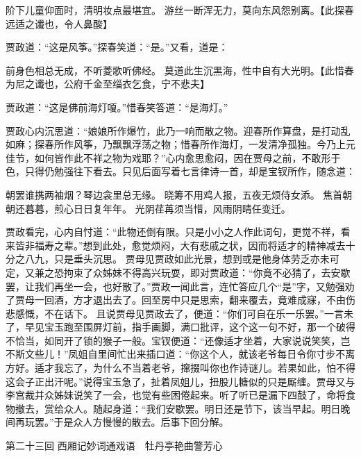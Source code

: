 \documentclass[12pt,oneside]{book}
\begin{document}
阶下儿童仰面时，清明妆点最堪宜。
游丝一断浑无力，莫向东风怨别离。【此探春远适之谶也，令人鼻酸】

贾政道：“这是风筝。”探春笑道：“是。”又看，道是：

前身色相总无成，不听菱歌听佛经。
莫道此生沉黑海，性中自有大光明。【此惜春为尼之谶也，公府千金至缁衣乞食，宁不悲夫】

贾政道：“这是佛前海灯嗄。”惜春笑答道：“是海灯。”

贾政心内沉思道：“娘娘所作爆竹，此乃一响而散之物。迎春所作算盘，是打动乱如麻；探春所作风筝，乃飘飘浮荡之物；惜春所作海灯，一发清净孤独。今乃上元佳节，如何皆作此不祥之物为戏耶？”心内愈思愈闷，因在贾母之前，不敢形于色，只得仍勉强往下看去。只见后面写着七言律诗一首，却是宝钗所作，随念道：

朝罢谁携两袖烟？琴边衾里总无缘。
晓筹不用鸡人报，五夜无烦侍女添。
焦首朝朝还暮暮，煎心日日复年年。
光阴荏苒须当惜，风雨阴晴任变迁。

贾政看完，心内自忖道：“此物还倒有限。只是小小之人作此词句，更觉不祥，看来皆非福寿之辈。”想到此处，愈觉烦闷，大有悲戚之状，因而将适才的精神减去十分之八九，只是垂头沉思。
贾母见贾政如此光景，想到或是他身体劳乏亦未可定，又兼之恐拘束了众姊妹不得高兴玩耍，即对贾政道：“你竟不必猜了，去安歇罢，让我们再坐一会，也好散了。”贾政一闻此言，连忙答应几个“是”字，又勉强劝了贾母一回酒，方才退出去了。回至房中只是思索，翻来覆去，竟难成寐，不由伤悲感慨，不在话下。
且说贾母见贾政去了，便道：“你们可自在乐一乐罢。”一言未了，早见宝玉跑至围屏灯前，指手画脚，满口批评，这个这一句不好，那一个破得不恰当，如同开了锁的猴子一般。宝钗便道：“还像适才坐着，大家说说笑笑，岂不斯文些儿！”凤姐自里间忙出来插口道：“你这个人，就该老爷每日令你寸步不离方好。适才我忘了，为什么不当着老爷，撺掇叫你也作诗谜儿。若果如此，怕不得这会子正出汗呢。”说得宝玉急了，扯着凤姐儿，扭股儿糖似的只是厮缠。贾母又与李宫裁并众姊妹说笑了一会，也觉有些困倦起来。听了听已是漏下四鼓了，命将食物撤去，赏给众人。随起身道：“我们安歇罢。明日还是节下，该当早起。明日晚间再玩罢。”于是众人方慢慢的散去。后事下回分解。



 
第二十三回  西厢记妙词通戏语　牡丹亭艳曲警芳心
\end{document}
